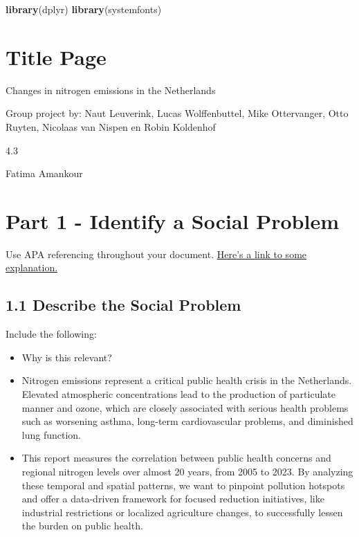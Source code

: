 \documentclass[
]{article}
\newenvironment{Shaded}{\begin{snugshade}}{\end{snugshade}}
\newcommand{\FunctionTok}[1]{\textcolor[rgb]{0.13,0.29,0.53}{\textbf{#1}}}
\newcommand{\NormalTok}[1]{#1}
\begin{document}
\begin{Shaded}
\begin{Highlighting}[]
\FunctionTok{library}\NormalTok{(dplyr)}
\FunctionTok{library}\NormalTok{(systemfonts)}
\end{Highlighting}
\end{Shaded}

\section{Title Page}\label{title-page}

Changes in nitrogen emissions in the Netherlands

Group project by: Naut Leuverink, Lucas Wolffenbuttel, Mike Ottervanger,
Otto Ruyten, Nicolaas van Nispen en Robin Koldenhof

4.3

Fatima Amankour

\section{Part 1 - Identify a Social
Problem}\label{part-1---identify-a-social-problem}

Use APA referencing throughout your document.
\href{https://www.mendeley.com/guides/apa-citation-guide/}{Here's a link
to some explanation.}

\subsection{1.1 Describe the Social
Problem}\label{describe-the-social-problem}

Include the following:

\begin{itemize}
\item
  Why is this relevant?
\item
  Nitrogen emissions represent a critical public health crisis in the
  Netherlands. Elevated atmospheric concentrations lead to the
  production of particulate manner and ozone, which are closely
  associated with serious health problems such as worsening asthma,
  long-term cardiovascular problems, and diminished lung function.
\item
  This report measures the correlation between public health concerns
  and regional nitrogen levels over almost 20 years, from 2005 to 2023.
  By analyzing these temporal and spatial patterns, we want to pinpoint
  pollution hotspots and offer a data-driven framework for focused
  reduction initiatives, like industrial restrictions or localized
  agriculture changes, to successfully lessen the burden on public
  health.
\end{itemize}
\end{document}
